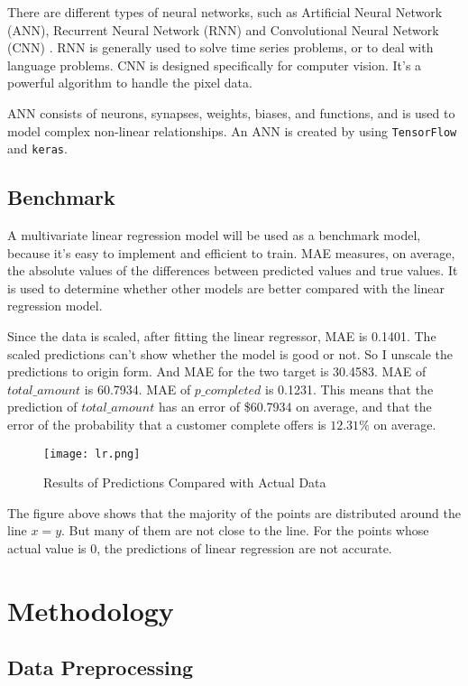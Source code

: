 \documentclass[a4paper,12pt]{article}
\begin{document}
There are different types of neural networks, such as Artificial Neural Network (ANN), Recurrent Neural Network (RNN) and 
Convolutional Neural Network (CNN) \cite{nn}. RNN is generally used to solve time series problems, or to deal with language 
problems. CNN is designed specifically for computer vision. It's a powerful algorithm to handle the pixel data.

ANN consists of neurons, synapses, weights, biases, and functions, and is used to model complex non-linear relationships. An ANN 
is created by using \texttt{TensorFlow} and \texttt{keras}.

\subsection*{Benchmark}

A multivariate linear regression model will be used as a benchmark model, because it's easy to implement and efficient to train. 
MAE measures, on average, the absolute values of the differences between predicted values and true values. It is used to 
determine whether other models are better compared with the linear regression model.

Since the data is scaled, after fitting the linear regressor, MAE is 0.1401. The scaled predictions can't show whether the model 
is good or not. So I unscale the predictions to origin form. And MAE for the two target is 30.4583. MAE of $total\_amount$ is 
60.7934. MAE of $p\_completed$ is 0.1231. This means that the prediction of $total\_amount$ has an error of \$60.7934 on average, 
and that the error of the probability that a customer complete offers is $12.31\%$ on average.

\begin{figure}[H]
    \centering
    \texttt{[image: lr.png]} 
    \caption{Results of Predictions Compared with Actual Data}
\end{figure}

The figure above shows that the majority of the points are distributed around the line $x = y$. But many of them are not close 
to the line. For the points whose actual value is 0, the predictions of linear regression are not accurate.

\section{Methodology}

\subsection*{Data Preprocessing}
\end{document}
